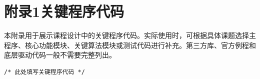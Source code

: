 \chapter*{附录1\quad 关键程序代码}

本附录用于展示课程设计中的关键程序代码。实际使用时，可根据具体课题选择主程序、核心功能模块、关键算法模块或测试代码进行补充。第三方库、官方例程和底层驱动代码一般不需要完整列出。

\begin{lstlisting}[style=embeddedc,title={关键程序代码}]
/* 此处填写关键程序代码 */
\end{lstlisting}